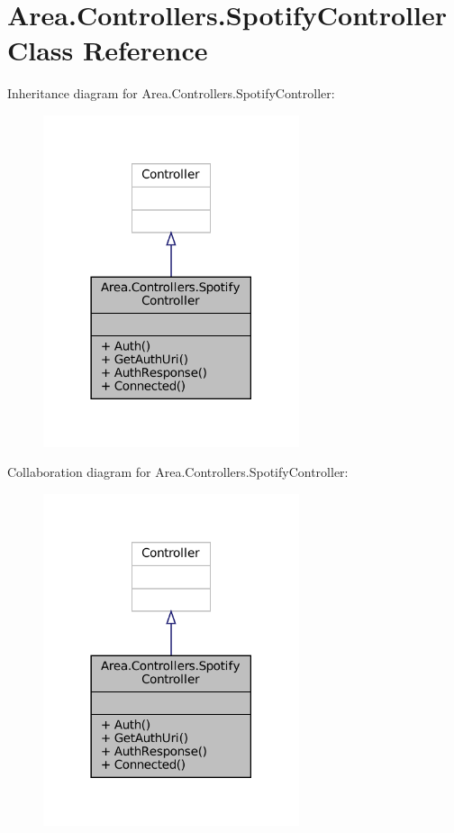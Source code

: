 \hypertarget{classArea_1_1Controllers_1_1SpotifyController}{}\section{Area.\+Controllers.\+Spotify\+Controller Class Reference}
\label{classArea_1_1Controllers_1_1SpotifyController}


Inheritance diagram for Area.\+Controllers.\+Spotify\+Controller\+:
\nopagebreak
\begin{figure}[H]
\begin{center}
\leavevmode
\includegraphics[width=213pt]{classArea_1_1Controllers_1_1SpotifyController__inherit__graph}
\end{center}
\end{figure}


Collaboration diagram for Area.\+Controllers.\+Spotify\+Controller\+:
\nopagebreak
\begin{figure}[H]
\begin{center}
\leavevmode
\includegraphics[width=213pt]{classArea_1_1Controllers_1_1SpotifyController__coll__graph}
\end{center}
\end{figure}
